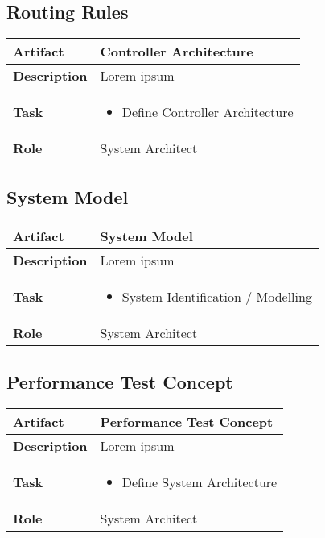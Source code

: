 \subsection{Routing Rules}
\begin{minipage}{\textwidth}
 \label{table:ch6_Artifact_Routing_Rules}
\begin{tabular}
	{|m{2cm}|m{10cm}|} \hline \bfseries Artifact & Controller Architecture\\
	\hline \bfseries Description & Lorem ipsum\\
	\hline \bfseries Task & 
	\begin{itemize}
		\item Define Controller Architecture 
	\end{itemize}
	\\
	\hline \bfseries Role & System Architect\\
	\hline 
\end{tabular}
\end{minipage}

\subsection{System Model}
\begin{minipage}{\textwidth}
 \label{table:ch6_Artifact_System_Model}
\begin{tabular}
	{|m{2cm}|m{10cm}|} \hline \bfseries Artifact & System Model\\
	\hline \bfseries Description & Lorem ipsum\\
	\hline \bfseries Task & 
	\begin{itemize}
		\item System Identification / Modelling
	\end{itemize}
	\\
	\hline \bfseries Role & System Architect\\
	\hline 
\end{tabular}
\end{minipage}

\subsection{Performance Test Concept}
\begin{minipage}{\textwidth}
 \label{table:ch6_Artifact_Performance_Test_Concept}
\begin{tabular}
	{|m{2cm}|m{10cm}|} \hline \bfseries Artifact & Performance Test Concept\\
	\hline \bfseries Description & Lorem ipsum\\
	\hline \bfseries Task & 
	\begin{itemize}
		\item Define System Architecture 
	\end{itemize}
	\\
	\hline \bfseries Role & System Architect\\
	\hline 
\end{tabular}
\end{minipage}

